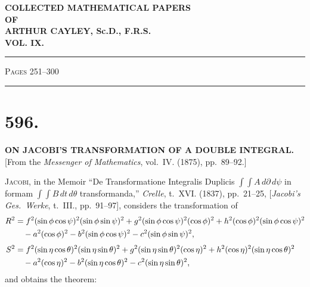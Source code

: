 \documentclass[11pt,a4paper]{article}
\begin{document}
\begin{center}
{\LARGE\bfseries COLLECTED MATHEMATICAL PAPERS\\[0.5em]
OF\\[0.5em]
ARTHUR CAYLEY, Sc.D., F.R.S.\\[1em]
VOL. IX.}
\end{center}

\vspace{2em}

\begin{center}
\rule{0.8\textwidth}{0.4pt}

\vspace{1em}
{\Large\scshape Pages 251--300}

\vspace{0.5em}
\rule{0.8\textwidth}{0.4pt}
\end{center}

\vspace{2em}

\section*{596.}
\begin{center}
{\large\bfseries ON JACOBI'S TRANSFORMATION OF A DOUBLE INTEGRAL.}\\[0.5em]
[From the \textit{Messenger of Mathematics}, vol.~IV. (1875), pp.~89--92.]
\end{center}

\textsc{Jacobi}, in the Memoir ``De Transformatione Integralis Duplicis
$\int\!\!\int A\,d\partial\,d\psi$ in formam $\int\!\!\int B\,dt\,d\theta$
transformanda,'' \textit{Crelle}, t.~XVI. (1837), pp.~21--25,
[\textit{Jacobi's Ges.\ Werke}, t.~III., pp.~91--97], considers the
transformation of
%
\begin{align*}
R^2 &= f^2(\sin\phi\cos\psi)^2(\sin\phi\sin\psi)^2
     + g^2(\sin\phi\cos\psi)^2(\cos\phi)^2
     + h^2(\cos\phi)^2(\sin\phi\cos\psi)^2 \\
    &\quad - a^2(\cos\phi)^2 - b^2(\sin\phi\cos\psi)^2 - c^2(\sin\phi\sin\psi)^2,\\[
\jot]
S^2 &= f^2(\sin\eta\cos\theta)^2(\sin\eta\sin\theta)^2
     + g^2(\sin\eta\sin\theta)^2(\cos\eta)^2
     + h^2(\cos\eta)^2(\sin\eta\cos\theta)^2 \\
    &\quad - a^2(\cos\eta)^2 - b^2(\sin\eta\cos\theta)^2 - c^2(\sin\eta\sin\theta)^2,
\end{align*}
%
and obtains the theorem:
\end{document}
